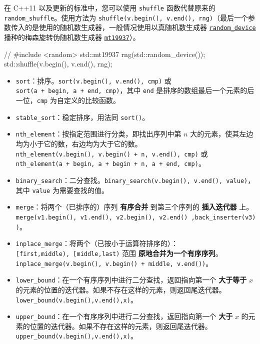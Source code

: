 在 C++11 以及更新的标准中，您可以使用 \texttt{shuffle} 函数代替原来的 \texttt{random\_shuffle}。使用方法为 \texttt{shuffle(v.begin(),\ v.end(),\ rng)}（最后一个参数传入的是使用的随机数生成器，一般情况使用以真随机数生成器 \href{https://zh.cppreference.com/w/cpp/numeric/random/random_device}{\texttt{random\_device}} 播种的梅森旋转伪随机数生成器 \href{https://zh.cppreference.com/w/cpp/numeric/random/mersenne_twister_engine}{\texttt{mt19937}}）。


\begin{codeline}
// #include <random>
std::mt19937 rng(std::random_device{}());
std::shuffle(v.begin(), v.end(), rng);
\end{codeline}


\begin{itemize}
\item
  \texttt{sort}：排序。\texttt{sort(v.begin(),\ v.end(),\ cmp)} 或 \texttt{sort(a\ +\ begin,\ a\ +\ end,\ cmp)}，其中 \texttt{end} 是排序的数组最后一个元素的后一位，\texttt{cmp} 为自定义的比较函数。
\item
  \texttt{stable\_sort}：稳定排序，用法同 \texttt{sort()}。
\item
  \texttt{nth\_element}：按指定范围进行分类，即找出序列中第 \(n\) 大的元素，使其左边均为小于它的数，右边均为大于它的数。\texttt{nth\_element(v.begin(),\ v.begin()\ +\ n,\ v.end(),\ cmp)} 或 \texttt{nth\_element(a\ +\ begin,\ a\ +\ begin\ +\ n,\ a\ +\ end,\ cmp)}。
\item
  \texttt{binary\_search}：二分查找。\texttt{binary\_search(v.begin(),\ v.end(),\ value)}，其中 \texttt{value} 为需要查找的值。
\item
  \texttt{merge}：将两个（已排序的）序列 \textbf{有序合并} 到第三个序列的 \textbf{插入迭代器} 上。\texttt{merge(v1.begin(),\ v1.end(),\ v2.begin(),\ v2.end()\ ,back\_inserter(v3))}。
\item
  \texttt{inplace\_merge}：将两个（已按小于运算符排序的）：\texttt{{[}first,middle),\ {[}middle,last)} 范围 \textbf{原地合并为一个有序序列}。\texttt{inplace\_merge(v.begin(),\ v.begin()\ +\ middle,\ v.end())}。
\item
  \texttt{lower\_bound}：在一个有序序列中进行二分查找，返回指向第一个 \textbf{大于等于} \(x\) 的元素的位置的迭代器。如果不存在这样的元素，则返回尾迭代器。\texttt{lower\_bound(v.begin(),v.end(),x)}。
\item
  \texttt{upper\_bound}：在一个有序序列中进行二分查找，返回指向第一个 \textbf{大于} \(x\) 的元素的位置的迭代器。如果不存在这样的元素，则返回尾迭代器。\texttt{upper\_bound(v.begin(),v.end(),x)}。
\end{itemize}

